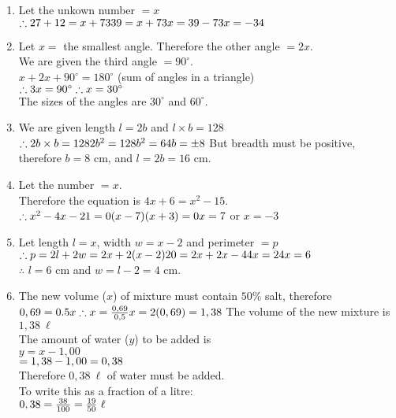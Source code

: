 \begin{solutions}{}
{\begin{enumerate}[itemsep=10pt, label=\textbf{\arabic*}. ]
\item Let the unkown number $=x$\\
$\therefore 27+12=x+73\\
39=x+73\\
x=39-73\\
x=-34\\$

\item Let $x=$ the smallest angle. Therefore the other angle $=2x$. \\
We are given the third angle $=90^{\circ}$. \\
$x+2x+90^{\circ} = 180^{\circ}$ (sum of angles in a triangle)\\
$\therefore 3x = 90^{\circ}\\
\therefore x= 30^{\circ}$\\
The sizes of the angles are $30^{\circ}$ and $60^{\circ}$. 
\item 
We are given length $l=2b$ and $l\times b=128$\\
$\therefore 2b\times b =128\\
2b^2=128\\
b^2=64\\
b=\pm8\\$
But breadth must be positive, therefore $b=8$ cm, and $l=2b=16$ cm.
\item Let the number $=x$. \\
Therefore the equation is $4x+6=x^2-15$.\\
$\therefore x^2-4x-21=0\\
(x-7)(x+3)=0\\
x=7$ or $x=-3$
\item Let length $l=x$, width $w=x-2$ and perimeter $=p$\\
$\therefore p = 2l+2w\\
=2x+2(x-2)\\
20=2x+2x-4\\
4x=24\\
x=6$\\
$\therefore$ $l=6$ cm and $w=l-2=4$ cm.
\item The new volume ($x$) of mixture must contain $50\%$ salt, therefore\\
$0,69 = 0.5x\\
\therefore x = \frac{0,69 }{0,5}\\
x = 2(0,69) = 1,38\\$
The volume of the new mixture is $1,38~ \ell$\\
The amount of water ($y$) to be added is \\
$y= x-1,00$\\
$= 1,38-1,00\\
=0,38$\\
Therefore $0,38~\ell$ of water must be added.\\
To write this as a fraction of a litre:\\
$0,38 = \frac{38}{100}\\
=\frac{19}{50}~\ell$

\end{enumerate}}
\end{solutions}



